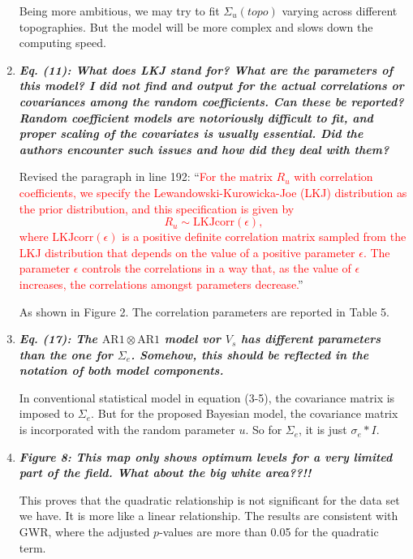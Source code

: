\documentclass[a4paper]{article}   	%
\newcommand{\AR}{\mathrm{AR}1}
\newcommand{\qtitle}[1]{\textit{\textbf{#1}}}
\begin{document}
\begin{enumerate}
    Being more ambitious, we may try to fit $\Sigma_u(topo)$ varying across different topographies. But the model will be more complex and slows down the computing speed. 

    \item \qtitle{Eq. (11): What does LKJ stand for? What are the parameters of this model? I did not find and output for the actual correlations or covariances among the random coefficients. Can these be reported? Random coefficient models are notoriously difficult to fit, and proper scaling of the covariates is usually essential. Did the authors encounter such issues and how did they deal with them?}

    Revised the paragraph in line 192: ``\textcolor{red}{For the matrix $R_u$ with correlation coefficients, we specify the Lewandowski-Kurowicka-Joe (LKJ) distribution \parencite{Lewandowski2009Generating} as the prior distribution, and this specification is given by
	\begin{equation}\label{eq:RPrior}
		R_u \sim \text{LKJcorr}(\epsilon),
	\end{equation}
	where $\text{LKJcorr}(\epsilon)$ is a positive definite correlation matrix sampled from the LKJ distribution that depends on the value of a positive parameter $\epsilon$. The parameter $\epsilon$ controls the correlations in a way that, as the value of $\epsilon$ increases, the correlations amongst parameters decrease.}''
    
    As shown in Figure 2. The correlation parameters are reported in Table 5.
     

    \item \qtitle{Eq. (17): The $\AR\otimes \AR$ model vor $V_s$ has different parameters than the one for $\Sigma_e$. Somehow, this should be reflected in the notation of both model components.}

    In conventional statistical model in equation (3-5), the covariance matrix is imposed to $\Sigma_e$. But for the proposed Bayesian model, the covariance matrix is incorporated with the random parameter $u$. So for $\Sigma_e$, it is just $\sigma_e*I$. 

    \item \qtitle{Figure 8: This map only shows optimum levels for a very limited part of the field. What about the big white area??!!}

    This proves that the quadratic relationship is not significant for the data set we have. It is more like a linear relationship. The results are consistent with GWR, where the adjusted $p$-values are more than 0.05 for the quadratic term.


\end{enumerate}
\end{document}

